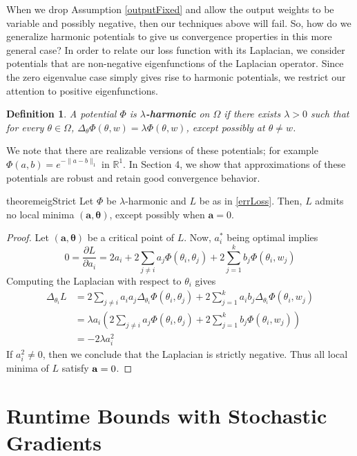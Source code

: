 \documentclass{article}
\newtheorem{definition}[theorem]{Definition}
\newcommand{\R}{{\mathbb{R}}}
\newcommand{\pd}[2]{\frac{\partial#1}{\partial#2}}
\begin{document}
When we drop Assumption \ref{outputFixed} and allow the output weights to be variable and possibly negative, then our techniques above will fail. So, how do we generalize harmonic potentials to give us convergence properties in this more general case? In order to relate our loss function with its Laplacian, we consider potentials that are non-negative eigenfunctions of the Laplacian operator. Since the zero eigenvalue case simply gives rise to harmonic potentials, we restrict our attention to positive eigenfunctions.
%
\begin{definition}
A potential $\Phi$ is {\bf$\lambda$-harmonic} on $\Omega$ if there exists $\lambda > 0$ such that for every $\theta \in \Omega$, $\Delta_\theta \Phi(\theta, w) = \lambda \Phi(\theta,w) $, except possibly at $\theta \neq w$.
\end{definition}
%
We note that there are realizable versions of these potentials; for example $\Phi(a,b) = e^{-\|a-b\|_1}$ in $\R^1$. In Section 4, we show that approximations of these potentials are robust and retain good convergence behavior.
%
\begin{restatable}{theorem}{eigStrict}
\label{EigStrict}
Let $\Phi$ be $\lambda$-harmonic and $L$ be as in \ref{errLoss}. Then, $L$ admits no local minima $\boldsymbol{(a,\theta)}$, except possibly when $\boldsymbol{a}=  0$.
\end{restatable}
\begin{proof}
Let $(\boldsymbol{a,\theta})$ be a critical point of $L$. Now, $a_i^*$ being optimal implies
\[0 = \pd{L}{a_i} = 2a_i  + 2\sum_{j\neq i} a_j \Phi(\theta_i,\theta_j) + 2\sum_{j=1}^k b_j \Phi(\theta_i,w_j)\]
Computing the Laplacian with respect to $\theta_i$ gives
\begin{align*}
\Delta_{\theta_i}L &= 2\sum_{j\neq i} a_i a_j \Delta_{\theta_i}\Phi(\theta_i,\theta_j) + 2\sum_{j=1}^k a_i b_j \Delta_{\theta_i}\Phi(\theta_i,w_j) \\
&= \lambda a_i\left(2\sum_{j\neq i} a_j \Phi(\theta_i,\theta_j) + 2\sum_{j=1}^k  b_j \Phi(\theta_i,w_j)\right) \\
&= -2\lambda a_i^2
\end{align*}
If $a_i^2 \neq 0$, then we conclude that the Laplacian is strictly negative. Thus all local minima of $L$ satisfy ${\bf a} = 0$.
\end{proof} 


\section{Runtime Bounds with Stochastic Gradients}
\end{document}
